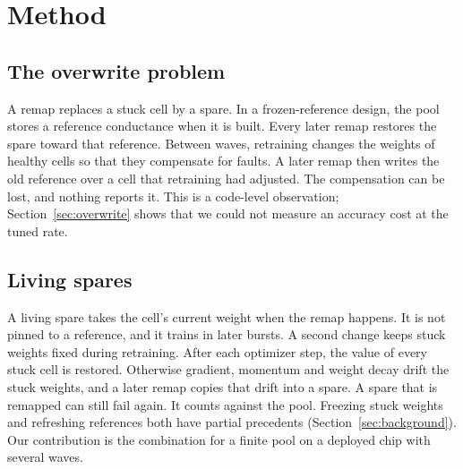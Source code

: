 \documentclass[journal]{IEEEtran}
\begin{document}
\section{Method}
\label{sec:method}

\subsection{The overwrite problem}
A remap replaces a stuck cell by a spare.
In a frozen-reference design, the pool stores a reference conductance when it is built.
Every later remap restores the spare toward that reference.
Between waves, retraining changes the weights of healthy cells so that they compensate for faults.
A later remap then writes the old reference over a cell that retraining had adjusted.
The compensation can be lost, and nothing reports it.
This is a code-level observation; Section~\ref{sec:overwrite} shows that we could not measure an accuracy cost at the tuned rate.

\subsection{Living spares}
A living spare takes the cell's current weight when the remap happens.
It is not pinned to a reference, and it trains in later bursts.
A second change keeps stuck weights fixed during retraining.
After each optimizer step, the value of every stuck cell is restored.
Otherwise gradient, momentum and weight decay drift the stuck weights, and a later remap copies that drift into a spare.
A spare that is remapped can still fail again.
It counts against the pool.
Freezing stuck weights and refreshing references both have partial precedents (Section~\ref{sec:background}).
Our contribution is the combination for a finite pool on a deployed chip with several waves.
\end{document}
